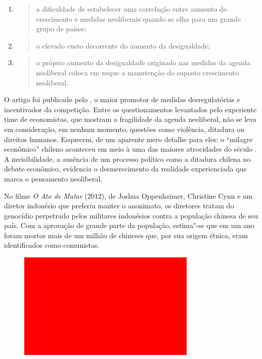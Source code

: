 \begin{enumerate}
\def\labelenumi{\alph{enumi})}
\item
  \begin{quote}
  a dificuldade de estabelecer uma correlação entre aumento do
  crescimento e medidas neoliberais quando se olha para um grande grupo
  de países;
  \end{quote}
\item
  \begin{quote}
  o elevado custo decorrente do aumento da desigualdade;
  \end{quote}
\item
  \begin{quote}
  o próprio aumento da desigualdade originado nas medidas da agenda
  neoliberal coloca em xeque a manutenção do suposto crescimento
  neoliberal.
  \end{quote}
\end{enumerate}

O artigo foi publicado pelo , o maior promotor de medidas
desregulatórias e incentivador da competição. Entre os questionamentos
levantados pelo experiente time de economistas, que mostram a
fragilidade da agenda neoliberal, não se leva em consideração, em nenhum
momento, questões como violência, ditadura ou direitos humanos.
Esquecem, de um aparente mero detalhe para eles: o ``milagre econômico''
chileno aconteceu em meio à uma das maiores atrocidades do século . A
invisibilidade, a ausência de um processo político como a ditadura
chilena no debate econômico, evidencia o desmerecimento da realidade
experienciada que marca o pensamento neoliberal.

\asterisc

No filme \emph{O Ato de Matar} (2012), de Joshua Oppenheimer, Christine
Cynn e um diretor indonésio que preferiu manter o anonimato, os
diretores tratam do genocídio perpetrado pelos militares indonésios
contra a população chinesa de seu país. Com a aprovação de grande parte
da população, estima"-se que em um ano foram mortos mais de um milhão de
chineses que, por sua origem étnica, eram identificados como comunistas.

\begin{figure}[!ht]
\centering
 \includegraphics[width=85mm]{./imgs/im1.jpg}
\caption{\footnotesize{}}
\end{figure}


